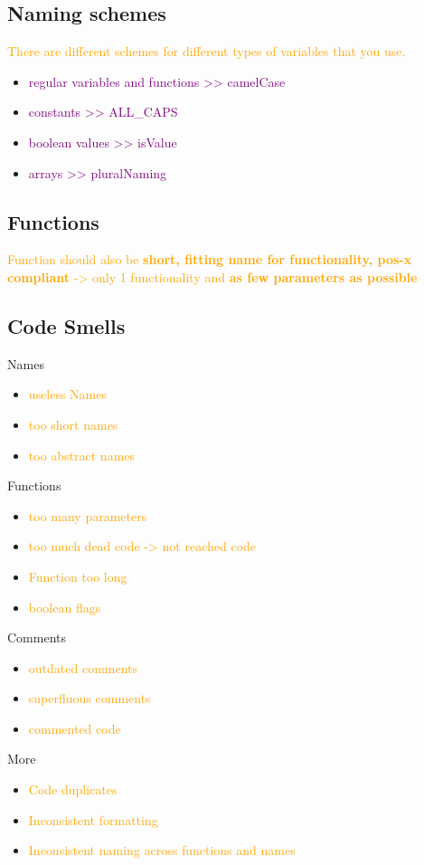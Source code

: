 \documentclass[main.tex,fontsize=6pt,paper=a4,paper=landscape,DIV=calc,]{scrartcl}
\begin{document}
\begin{multicols*}{4}
\subsection{Naming schemes}  
\textcolor{orange}{There are different schemes for different types of variables that you use.}
\begin{itemize}
\item \textcolor{purple}{regular variables and functions >> camelCase}
\item \textcolor{purple}{constants >> ALL\_CAPS}
\item \textcolor{purple}{boolean values >> isValue}
\item \textcolor{purple}{arrays >> pluralNaming}
\end{itemize} 

\subsection{Functions}  
\textcolor{orange}{Function should also be \textbf{short, fitting name for functionality, pos-x compliant} -> only 1 functionality and \textbf{as few parameters as possible}}

\subsection{Code Smells}  
Names
\begin{itemize}
\item \textcolor{orange}{useless Names}
\item \textcolor{orange}{too short names}
\item \textcolor{orange}{too abstract names}
\end{itemize}
Functions
\begin{itemize}
\item \textcolor{orange}{too many parameters}
\item \textcolor{orange}{too much dead code -> not reached code}
\item \textcolor{orange}{Function too long}
\item \textcolor{orange}{boolean flags}
\end{itemize} 
Comments
\begin{itemize}
\item \textcolor{orange}{outdated comments}
\item \textcolor{orange}{superfluous comments}
\item \textcolor{orange}{commented code}
\end{itemize} 
More
\begin{itemize}
\item \textcolor{orange}{Code duplicates}
\item \textcolor{orange}{Inconsistent formatting}
\item \textcolor{orange}{Inconsistent naming across functions and names}
\end{itemize}



\end{multicols*}
\end{document}
